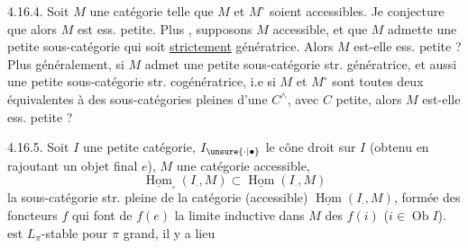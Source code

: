 4.16.4. Soit $M$ une catégorie telle que $M$
et $M^{\circ}$ soient accessibles. Je conjecture
que alors $M$ est ess. petite. Plus
, supposons $M$ accessible, et
que $M$ admette une petite sous-catégorie
qui soit \uline{strictement} génératrice. Alors
$M$ est-elle ess. petite ? Plus généralement,
si $M$ admet une petite sous-catégorie
str. génératrice, et aussi une petite
sous-catégorie str. cogénératrice, i.e si
$M$ et $M^{\circ}$ sont toutes deux équivalentes
à des sous-catégories pleines d'une
$C^{\wedge}$, avec $C$ petite, alors $M$ est-elle
ess. petite ?

4.16.5. Soit $I$ une petite catégorie,
$I_{\unsure{\cdot|\bullet}}$ le cône droit sur $I$ (obtenu en rajoutant
un objet final $e$), $M$ une catégorie accessible,
\[
\underline{\operatorname{Hom}}_{\square}(I_{\cdot},M)\subset\underline{\operatorname{Hom}}(I_{\cdot},M)
\]
la sous-catégorie str. pleine de  la catégorie
(accessible) $\underline{\operatorname{Hom}}(I_{\cdot},M)$, formée des foncteurs
$f$ qui font de $f(e)$ la limite inductive
dans $M$ des $f(i)$ ($i\in\operatorname{Ob}I$).  
est $L_\pi$-stable pour $\pi$ grand,  il y a lieu
